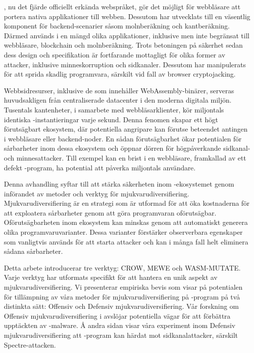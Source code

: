 \Wasm, nu det fjärde officiellt erkända webspråket, gör det möjligt för webbläsare att portera nativa applikationer till webben. Dessutom har \Wasm utvecklats till en väsentlig komponent för backend-scenarier såsom molnberäkning och kantberäkning. Därmed används \Wasm i en mängd olika applikationer, inklusive men inte begränsat till webbläsare, blockchain och molnberäkning. Trots betoningen på säkerhet sedan dess design och specifikation är \Wasm fortfarande mottagligt för olika former av attacker, inklusive minneskorruption och sidkanaler. Dessutom har \Wasm manipulerats för att sprida skadlig programvara, särskilt vid fall av browser cryptojacking.

Webbsidresurser, inklusive de som innehåller WebAssembly-binärer, serveras huvudsakligen från centraliserade datacenter i den moderna digitala miljön. Tusentals kantenheter, i samarbete med webbläsarklienter, kör miljontals identiska \Wasm-instantieringar varje sekund. Denna fenomen skapar ett högt förutsägbart ekosystem, där potentiella angripare kan förutse beteendet antingen i webbläsare eller backend-noder. En sådan förutsägbarhet ökar potentialen för sårbarheter inom dessa ekosystem och öppnar dörren för högpåverkande sidkanal- och minnesattacker. Till exempel kan en brist i en webbläsare, framkallad av ett defekt \Wasm-program, ha potential att påverka miljontals användare.

Denna avhandling syftar till att stärka säkerheten inom \Wasm-ekosystemet genom införandet av metoder och verktyg för mjukvarudiversifiering. Mjukvarudiversifiering är en strategi som är utformad för att öka kostnaderna för att exploatera sårbarheter genom att göra programvaran oförutsägbar. Oförutsägbarheten inom ekosystem kan minskas genom att automatiskt generera olika programvaruvarianter. Dessa varianter förstärker observerbara egenskaper som vanligtvis används för att starta attacker och kan i många fall helt eliminera sådana sårbarheter.

Detta arbete introducerar tre verktyg: CROW, MEWE och WASM-MUTATE. Varje verktyg har utformats specifikt för att hantera en unik aspekt av mjukvarudiversifiering. Vi presenterar empiriska bevis som visar på potentialen för tillämpning av våra metoder för mjukvarudiversifiering på \Wasm-program på två distinkta sätt: Offensiv och Defensiv mjukvarudiversifiering. Vår forskning om Offensiv mjukvarudiversifiering i \Wasm avslöjar potentiella vägar för att förbättra upptäckten av \Wasm-malware. Å andra sidan visar våra experiment inom Defensiv mjukvarudiversifiering att \Wasm-program kan härdat mot sidkanalattacker, särskilt Spectre-attacken.